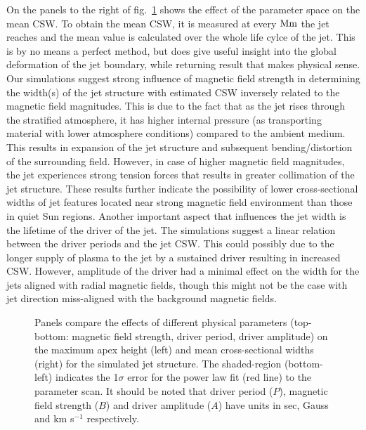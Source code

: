\documentclass[12pt]{ociamthesis}
\begin{document}
%
On the panels to the right of fig.~\ref{parameter_scan_lines} shows the effect of the parameter space on the mean CSW. To obtain the mean CSW, it is measured at every $\rm{Mm}$ the jet reaches and the mean value is calculated over the whole life cylce of the jet. This is by no means a perfect method, but does give useful insight into the global deformation of the jet boundary, while returning result that makes physical sense. Our simulations suggest strong influence of magnetic field strength in determining the width(s) of the jet structure with estimated CSW inversely related to the magnetic field magnitudes. This is due to the fact that as the jet rises through the stratified atmosphere, it has higher internal pressure (as transporting material with lower atmosphere conditions) compared to the ambient medium. This results in expansion of the jet structure and subsequent bending/distortion of the surrounding field. However, in case of higher magnetic field magnitudes, the jet experiences strong tension forces that results in greater collimation of the jet structure. These results further indicate the possibility of lower cross-sectional widths of jet features located near strong magnetic field environment than those in quiet Sun regions. Another important aspect that influences the jet width is the lifetime of the driver of the jet. The simulations suggest a linear relation between the driver periods and the jet CSW. This could possibly due to the longer supply of plasma to the jet by a sustained driver resulting in increased CSW. However, amplitude of the driver had a minimal effect on the width for the jets aligned with radial magnetic fields, though this might not be the case with jet direction miss-aligned with the background magnetic fields.
\begin{figure}
\captionsetup[subfigure]{labelformat=empty}
\centering
{} 
\caption{Panels compare the effects of different physical parameters (top-bottom: magnetic field strength, driver period, driver amplitude) on the maximum apex height (left) and mean cross-sectional widths (right) for the simulated jet structure. The shaded-region (bottom-left) indicates the 1$\sigma$ error for the power law fit (red line) to the parameter scan. It should be noted that driver period ($P$), magnetic field strength ($B$) and driver amplitude ($A$) have units in sec, Gauss and km s$^{-1}$ respectively.}
\label{parameter_scan_lines}
\end{figure}
\end{document}
